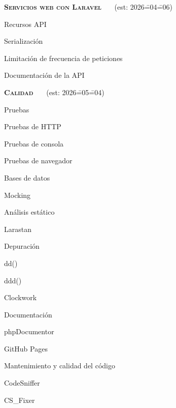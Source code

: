 \begin{longenum}
\begin{longenum}
    \end{longenum}
    \item \textbf{\textsc{Servicios web con Laravel}} \dual\ \ \ (est: 2026\==04\==06)
    \begin{longenum}
        \item Recursos API
        \item Serialización
        \item Limitación de frecuencia de peticiones
        \item Documentación de la API
    \end{longenum}
    \item \textbf{\textsc{Calidad}} \ \ \ (est: 2026\==05\==04)
    \begin{longenum}
        \item Pruebas
        \begin{longenum}
            \item Pruebas de HTTP
            \item Pruebas de consola
            \item Pruebas de navegador
            \item Bases de datos
            \item Mocking
        \end{longenum}
        \item Análisis estático
        \begin{longenum}
            \item Larastan
        \end{longenum}
        \item Depuración
        \begin{longenum}
            \item dd()
            \item ddd()
            \item Clockwork
        \end{longenum}
        \item Documentación
        \begin{longenum}
            \item phpDocumentor
            \item GitHub Pages
        \end{longenum}
        \item Mantenimiento y calidad del código
        \begin{longenum}
            \item CodeSniffer
            \item CS\_Fixer

\end{longenum}
\end{longenum}
\end{longenum}
